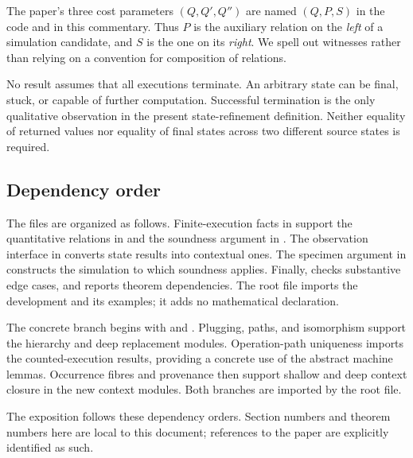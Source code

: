 The paper's three cost parameters $(Q,Q',Q'')$ are named $(Q,P,S)$ in the
code and in this commentary. Thus $P$ is the auxiliary relation on the
\emph{left} of a simulation candidate, and $S$ is the one on its
\emph{right}. We spell out witnesses rather than relying on a convention for
composition of relations.

No result assumes that all executions terminate. An arbitrary state can be
final, stuck, or capable of further computation. Successful termination is the
only qualitative observation in the present state-refinement definition.
Neither equality of returned values nor equality of final states across two
different source states is required.

\subsection{Dependency order}

The files are organized as follows. Finite-execution facts in
 support the quantitative
relations in  and
the soundness argument in
. The observation interface
in  converts state
results into contextual ones. The specimen argument in
 constructs the
simulation to which soundness applies. Finally,
 checks substantive edge
cases, and  reports theorem
dependencies. The root file  imports
the development and its examples; it adds no mathematical declaration.

The concrete branch begins with
 and
. Plugging, paths, and
isomorphism support the hierarchy and deep replacement modules. Operation-path
uniqueness imports the counted-execution results, providing a concrete use of the
abstract machine lemmas. Occurrence fibres and provenance then support shallow and deep context closure
in the new context modules. Both branches are imported by the root file.

The exposition follows these dependency orders. Section numbers and theorem
numbers here are local to this document; references to the paper are explicitly
identified as such.
